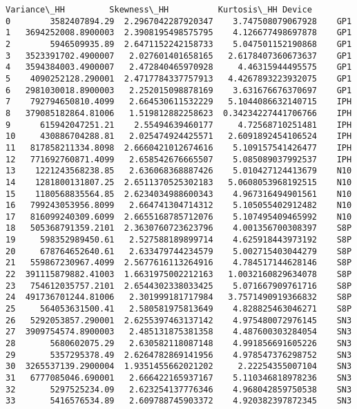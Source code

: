 \documentclass[11pt]{article}
\begin{document}
\begin{tcolorbox}[breakable, size=fbox, boxrule=.5pt, pad at break*=1mm, opacityfill=0]
\begin{Verbatim}[commandchars=\\\{\}]
           Variance\_HH         Skewness\_HH          Kurtosis\_HH Device
0        3582407894.29  2.2967042287920347    3.747508079067928    GP1
1   3694252008.8900003  2.3908195498575795    4.126677498697878    GP1
2        5946509935.89  2.6471152242158733    5.047501152190868    GP1
3   3523391702.4900007   2.027601401658165   2.6178407360673637    GP1
4   3594384003.4900007   2.472840465970928     4.46315944495575    GP1
5    4090252128.290001  2.4717784337757913   4.4267893223932075    GP1
6   2981030018.8900003   2.252015098878169    3.631676676370697    GP1
7    792794650810.4099   2.664530611532229   5.1044086632140715    IPH
8   379085182864.81006   1.519812882258623  0.34234227441706766    IPH
9      615942047251.21    2.55494639460177     4.72568710251481    IPH
10     430886704288.81   2.025474924425571   2.6091892454106524    IPH
11   817858211334.8098  2.6660421012674616    5.109157541426477    IPH
12   771692760871.4099   2.658542676665507    5.085089037992537    IPH
13    1221243568238.85   2.636068368887426    5.010427124413679    N10
14    1281800131807.25  2.6511370525302183   5.0608053968192515    N10
15    1180568835564.85  2.6234034988600343    4.967316494901561    N10
16   799243053956.8099   2.664741304714312    5.105055402912482    N10
17   816099240309.6099  2.6655168785712076    5.107495409465992    N10
18   505368791359.2101  2.3630760723623796    4.001356700308397    S8P
19     598352989450.61   2.527588189899714    4.625918443973192    S8P
20     678764652640.61   2.633479744234579    5.002715403044279    S8P
21   559867230967.4099  2.5677616113264916    4.784517144628146    S8P
22  391115879882.41003  1.6631975002212163   1.0032160829634078    S8P
23   754612035757.2101  2.6544302338033425    5.071667909761716    S8P
24  491736701244.81006   2.301999181717984   3.7571490919366832    S8P
25     564053631500.41   2.580581975813649    4.828825463046271    S8P
26   5292053857.290001  2.6255397463137142    4.975480072976145    SN3
27  3909754574.8900003   2.485131875381358    4.487600303284054    SN3
28       5680602075.29   2.630582118087148    4.991856691605226    SN3
29       5357295378.49  2.6264782869141956    4.978547376298752    SN3
30  3265537139.2900004  1.9351455662021202     2.22254355007104    SN3
31   6777085046.690001   2.666422165937167    5.110346818978236    SN3
32       5297525234.09   2.623254137776346    4.968042859750538    SN3
33       5416576534.89   2.609788745903372    4.920382397872345    SN3
\end{Verbatim}
\end{tcolorbox}
        
\end{document}
